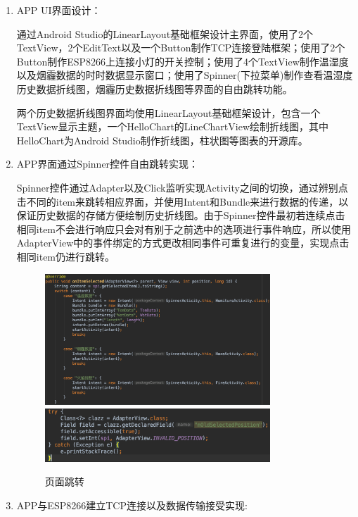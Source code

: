 \begin{enumerate}

\item {APP UI界面设计}：

通过Android Studio的LinearLayout基础框架设计主界面，使用了2个TextView，2个EditText以及一个Button制作TCP连接登陆框架；使用了2个Button制作ESP8266上连接小灯的开关控制；使用了4个TextView制作温湿度以及烟霾数据的时时数据显示窗口；使用了Spinner(下拉菜单)制作查看温湿度历史数据折线图，烟霾历史数据折线图等界面的自由跳转功能。

两个历史数据折线图界面均使用LinearLayout基础框架设计，包含一个TextView显示主题，一个HelloChart的LineChartView绘制折线图，其中HelloChart为Android Studio制作折线图，柱状图等图表的开源库。

\item {APP界面通过Spinner控件自由跳转实现}：

Spinner控件通过Adapter以及Click监听实现Activity之间的切换，通过辨别点击不同的item来跳转相应界面，并使用Intent和Bundle来进行数据的传递，以保证历史数据的存储方便绘制历史折线图。由于Spinner控件最初若连续点击相同item不会进行响应只会对有别于之前选中的选项进行事件响应，所以使用AdapterView中的事件绑定的方式更改相同事件可重复进行的变量，实现点击相同item仍进行跳转。

\begin{figure}[htbp]
    \centering
    \includegraphics[width=0.8\textwidth]{figures/code/6}
    \includegraphics[width=0.8\textwidth]{figures/code/7}
    \caption{页面跳转}
\end{figure}

\item {APP与ESP8266建立TCP连接以及数据传输接受实现}:


\end{enumerate}
